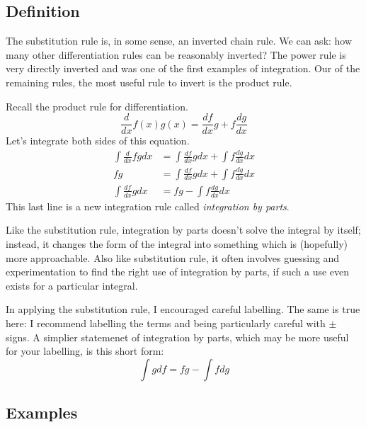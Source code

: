 \documentclass[fleqn]{report}
\begin{document}
\subsection{Definition}
\label{parts-definition}

The substitution rule is, in some sense, an inverted
chain rule. We can ask: how many other differentiation rules
can be reasonably inverted? The power rule is very directly
inverted and was one of the first examples of integration.
Our of the remaining rules, the most useful rule to invert is
the product rule. 

\begin{defn}
Recall the product rule for differentiation.
\begin{equation*}
\frac{d}{dx} f(x) g(x) = \frac{df}{dx} g + f \frac{dg}{dx} 
\end{equation*}
Let's integrate both sides of this equation.
\begin{align*}
\int \frac{d}{dx} fg dx & = \int \frac{df}{dx} g dx + \int f
\frac{dg}{dx} dx \\
fg & = \int \frac{df}{dx} g dx + \int f
\frac{dg}{dx} dx \\
\int \frac{df}{dx} g dx & = fg - \int f \frac{dg}{dx} dx
\end{align*}
This last line is a new integration rule called
\emph{integration by parts}.
\end{defn}

Like the substitution rule, integration by parts doesn't
solve the integral by itself; instead, it changes the form of
the integral into something which is (hopefully) more
approachable. Also like substitution rule, it often involves
guessing and experimentation to find the right use of
integration by parts, if such a use even exists for a
particular integral.

In applying the substitution rule, I encouraged careful
labelling. The same is true here: I recommend
labelling the terms and being particularly careful with $\pm$
signs. A simplier statemenet of integration by parts, which
may be more useful for your labelling, is this short form:
\begin{equation*}
\int g df = fg - \int f dg
\end{equation*}

\subsection{Examples}
\label{parts-examples}
\end{document}
